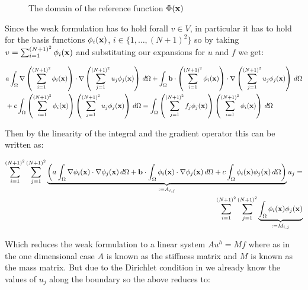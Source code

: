 \begin{figure}
\centering

\caption{The domain of the reference function $\Phi(\mathbf{x})$}
\label{fig:reference-function-domain}
\end{figure}

Since the weak formulation  has to hold
forall $v \in V$, in particular it has to hold for the basis functions
$\phi_i(\mathbf{x})$, $i \in \{1,\ldots,(N + 1)^2\}$ so by taking
$v = \sum_{i = 1}^{(N+1)^2}\phi_i(\mathbf{x})$ and substituting our expansions
for $u$ and $f$ we get:

\begin{align}
\begin{split}
    &a\int_{\Omega}\nabla\left(\sum_{i = 1}^{(N+1)^2}\phi_i(\mathbf{x})\right) \cdot
                  \nabla\left(\sum_{j = 1}^{(N+1)^2}u_j\phi_j(\mathbf{x})\right)\, d\Omega
    +\int_{\Omega}\mathbf{b}\cdot\left(\sum_{i = 1}^{(N+1)^2}\phi_i(\mathbf{x})\right) \cdot
                  \nabla\left(\sum_{j = 1}^{(N+1)^2}u_j\phi_j(\mathbf{x})\right)\, d\Omega \\
    &+c\int_{\Omega}\left(\sum_{i = 1}^{(N + 1)^2}\phi_i(\mathbf{x})\right)
                    \left(\sum_{j = 1}^{(N + 1)^2}u_j\phi_j(\mathbf{x})\right)\, d\Omega =
    \int_{\Omega}\left(\sum_{j = 1}^{(N + 1)^2}f_j\phi_j(\mathbf{x})\right)
                 \left(\sum_{i = 1}^{(N + 1)^2}\phi_i(\mathbf{x})\right)\, d\Omega
\end{split}
\end{align}

Then by the linearity of the integral and the gradient operator this can be
written as:

\begin{align}\label{eq:twod-deterministic-discrete}
  \begin{split}
    \sum_{i=1}^{(N+1)^2}\sum_{j=1}^{(N+1)^2}
      \underbrace{\left(
         a\int_{\Omega}\nabla\phi_i(\mathbf{x})\cdot\nabla\phi_j(\mathbf{x})\, d\Omega
         + \mathbf{b}\cdot\int_{\Omega}\phi_i(\mathbf{x})\cdot\nabla\phi_j(\mathbf{x})\, d\Omega
         +c\int_{\Omega}\phi_i(\mathbf{x})\phi_j(\mathbf{x})\, d\Omega
      \right)}_{:= A_{i,j}}u_j = \\
    \sum_{i=1}^{(N + 1)^2}\sum_{j=1}^{(N + 1)^2}
      \underbrace{\int_{\Omega}\phi_i(\mathbf{x})\phi_j(\mathbf{x})}_{:= M_{i,j}}
  \end{split}
\end{align}

Which reduces the weak formulation  to a linear
system $Au^h = Mf$ where as in the one dimensional case $A$ is known as
the stiffness matrix and $M$ is known as the mass matrix. But due to the Dirichlet
condition in  we already know the values of $u_j$
along the boundary so the above reduces to:

